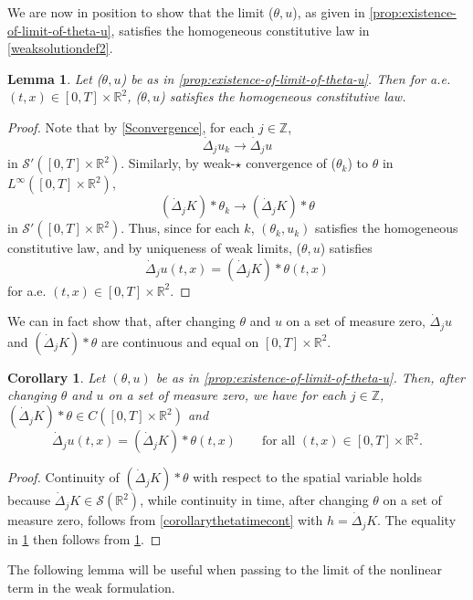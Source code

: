 \documentclass[11pt,reqno,xcolor=svgnames]{amsart}
\def\R{{\mathbb R}}
\def\Z{{\mathbb Z}}
\theoremstyle{plain}
\newtheorem{cor}[theorem]{Corollary}
\newtheorem{lemma}[theorem]{Lemma}
\theoremstyle{definition}
\theoremstyle{plain}
\theoremstyle{remark}
\newcommand{\Del}{\dot{\Delta}}
\begin{document}
We are now in position to show that the limit ($\theta,u$), as given in \cref{prop:existence-of-limit-of-theta-u}, satisfies the homogeneous constitutive law in \cref{weaksolutiondef2}. 
\begin{lemma}\label{constlaw}
Let ($\theta,u$) be as in \cref{prop:existence-of-limit-of-theta-u}.  Then for a.e. $(t,x)\in [0,T]\times\R^2$, ($\theta,u$) satisfies the homogeneous constitutive law.
\end{lemma}
\begin{proof}
Note that by \cref{Sconvergence}, for each $j\in\Z$,
$$ \dot{\Delta}_j u_k \longrightarrow \dot{\Delta}_j u$$
in $\mathcal{S'}([0,T]\times\R^2)$.  Similarly, by weak-$\star$ convergence of ($\theta_k$) to $\theta$ in $L^{\infty} ([0,T]\times \R^2)$, 
$$(\dot{\Delta}_jK)\ast {\theta}_k \longrightarrow  (\dot{\Delta}_jK)\ast \theta$$
in $\mathcal{S'}([0,T]\times\R^2)$.
Thus, since for each $k$, $(\theta_k,u_k)$ satisfies the homogeneous constitutive law, and by uniqueness of weak limits, ($\theta,u$) satisfies $$\dot{\Delta}_j u(t,x) = (\dot{\Delta}_jK)\ast \theta(t,x)$$
for a.e. $(t,x)\in [0,T]\times\R^2$.
\end{proof}
We can in fact show that, after changing $\theta$ and $u$ on a set of measure zero, $\Del_j u$ and $(\Del_jK)\ast\theta$ are continuous and equal on $[0,T]\times\R^2$.
\begin{cor}\label{constlaweverywhere}
Let $(\theta,u)$ be as in \cref{prop:existence-of-limit-of-theta-u}.  Then, after changing $\theta$ and $u$ on a set of measure zero, we have for each $j\in \Z$, $(\Del_jK)\ast\theta \in C([0,T]\times\R^2)$ and 
$$\Del_j u(t,x) = (\Del_jK)\ast\theta(t,x) \qquad \text{for all } (t,x)\in [0,T]\times \R^2.$$
\end{cor}
\begin{proof}
Continuity of $(\Del_jK)\ast\theta$ with respect to the spatial variable holds because $\Del_j K \in \mathcal{S}(\R^2)$, while continuity in time, after changing $\theta$ on a set of measure zero, follows from \cref{corollarythetatimecont} with $h=\Del_j K$.  The equality in \cref{constlaweverywhere} then follows from \cref{constlaw}.  
\end{proof}


The following lemma will be useful when passing to the limit of the nonlinear term in the weak formulation.
\end{document}
